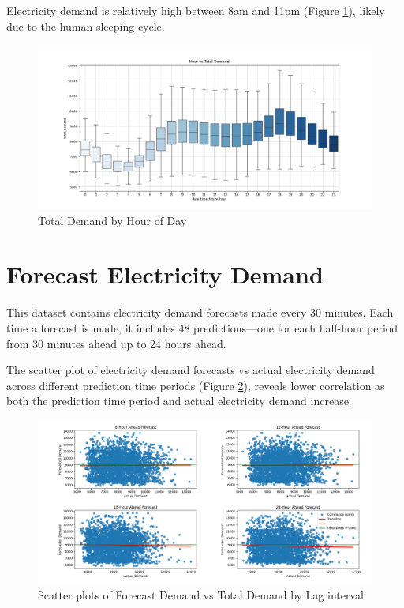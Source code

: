\documentclass[mstat,12pt]{unswthesis}
\begin{document}
Electricity demand is relatively high between 8am and 11pm (Figure \ref{fig:hourdemand}), likely due to the human sleeping cycle.

\begin{figure}
\includegraphics[width=1\linewidth,height=0.3\textheight]{images/demandHour} \caption{Total Demand by Hour of Day}\label{fig:hourdemand}
\end{figure}

\section{Forecast Electricity Demand}\label{forecast-electricity-demand}

This dataset contains electricity demand forecasts made every 30 minutes. Each time a forecast is made, it includes 48 predictions---one for each half-hour period from 30 minutes ahead up to 24 hours ahead.

\bigskip

The scatter plot of electricity demand forecasts vs actual electricity demand across different prediction time periods (Figure \ref{fig:forecastdem}), reveals lower correlation as both the prediction time period and actual electricity demand increase.

\begin{figure}
\includegraphics[width=1\linewidth,height=0.4\textheight]{images/forecastdemscatter} \caption{Scatter plots of Forecast Demand vs Total Demand by Lag interval}\label{fig:forecastdem}
\end{figure}
\end{document}
